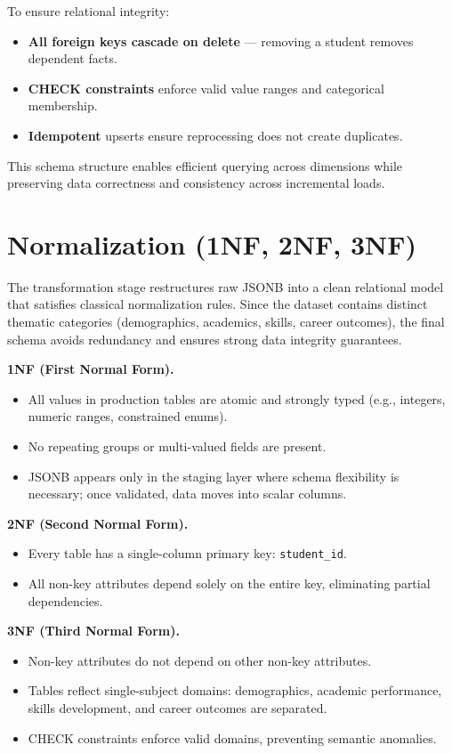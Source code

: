 \documentclass[11pt]{article}
\begin{document}
\vspace{4pt}
To ensure relational integrity:
\begin{itemize}
\item \textbf{All foreign keys cascade on delete} — removing a student removes dependent facts.
\item \textbf{CHECK constraints} enforce valid value ranges and categorical membership.
\item \textbf{Idempotent} upserts ensure reprocessing does not create duplicates.
\end{itemize}

\vspace{3pt}
This schema structure enables efficient querying across dimensions while preserving data correctness and consistency across incremental loads.


\section{Normalization (1NF, 2NF, 3NF)}
The transformation stage restructures raw JSONB into a clean relational model that satisfies classical normalization rules. Since the dataset contains distinct thematic categories (demographics, academics, skills, career outcomes), the final schema avoids redundancy and ensures strong data integrity guarantees.

\textbf{1NF (First Normal Form).}
\begin{itemize}
\item All values in production tables are atomic and strongly typed (e.g., integers, numeric ranges, constrained enums).
\item No repeating groups or multi-valued fields are present.
\item JSONB appears only in the staging layer where schema flexibility is necessary; once validated, data moves into scalar columns.
\end{itemize}

\textbf{2NF (Second Normal Form).}
\begin{itemize}
\item Every table has a single-column primary key: \texttt{student\_id}.
\item All non-key attributes depend solely on the entire key, eliminating partial dependencies.
\end{itemize}

\textbf{3NF (Third Normal Form).}
\begin{itemize}
\item Non-key attributes do not depend on other non-key attributes.
\item Tables reflect single-subject domains: demographics, academic performance, skills development, and career outcomes are separated.
\item CHECK constraints enforce valid domains, preventing semantic anomalies.
\end{itemize}
\end{document}
